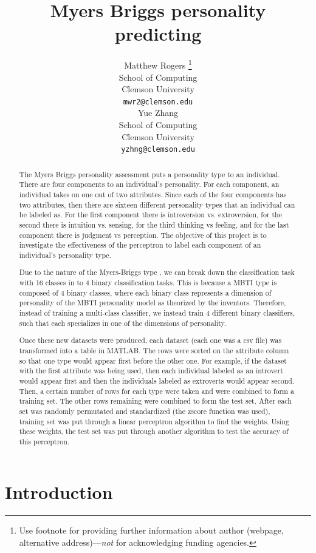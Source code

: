 \documentclass{article}
\title{Myers Briggs personality predicting}
\author{
  Matthew Rogers \thanks{Use footnote for providing further information
    about author (webpage, alternative address)---\emph{not} for acknowledging
    funding agencies.} \\
  School of Computing\\
  Clemson University\\
  \texttt{mwr2@clemson.edu} \\
  \And
  Yue Zhang\\
  School of Computing\\
  Clemson University\\
  \texttt{yzhng@clemson.edu} \\
}
\begin{document}
\maketitle


\begin{abstract}
  The Myers Briggs personality assessment puts a personality type to an individual. There are four components to an individual’s personality. For each component, an individual takes on one out of two attributes. Since each of the four components has two attributes, then there are sixteen different personality types that an individual can be labeled as. For the first component there is introversion vs. extroversion, for the second there is intuition vs. sensing, for the third thinking vs feeling, and for the last component there is judgment vs perception. The objective of this project is to investigate the effectiveness of the perceptron to label each component of an individual’s personality type.

  Due to the nature of the Myers-Briggs type , we can break down the classification task with 16 classes in to 4 binary classification tasks. This is because a MBTI type is composed of 4 binary classes, where each binary class represents a dimension of personality of the MBTI personality model as theorized by the inventors. Therefore, instead of training a multi-class classifier, we instead train 4 different binary classifiers, such that each specializes in one of the dimensions of personality. 

  Once these new datasets were produced, each dataset (each one was a csv file) was transformed into a table in MATLAB. The rows were sorted on the attribute column so that one type would appear first before the other one. For example, if the dataset with the first attribute was being used, then each individual labeled as an introvert would appear first and then the individuals labeled as extroverts would appear second. Then, a certain number of rows for each type were taken and were combined to form a training set. The other rows remaining were combined to form the test set. After each set was randomly permutated and standardized (the zscore function was used), training set was put through a linear perceptron algorithm to find the weights. Using these weights, the test set was put through another algorithm to test the accuracy of this perceptron. 
  
\end{abstract}


\section{Introduction}
\end{document}

